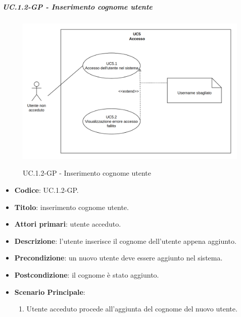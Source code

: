 			\subparagraph{UC\theuccount.1.2-GP - Inserimento cognome utente}
				\begin{figure}[H]
					\centering
					\includegraphics[width=\columnwidth]{img/UC5.png}\\
					\caption{UC\theuccount.1.2-GP - Inserimento cognome utente}
				\end{figure}
				\begin{itemize}
					\item \textbf{Codice}: UC\theuccount.1.2-GP.
					\item \textbf{Titolo}: inserimento cognome utente.
					\item \textbf{Attori primari}: utente acceduto.
					\item \textbf{Descrizione}: l'utente inserisce il cognome dell'utente appena aggiunto.
					\item \textbf{Precondizione}: un nuovo utente deve essere aggiunto nel sistema.
					\item \textbf{Postcondizione}: il cognome è stato aggiunto.
					\item \textbf{Scenario Principale}:
					\begin{enumerate}
						\item Utente acceduto procede all'aggiunta del cognome del nuovo utente.
					\end{enumerate}
				\end{itemize}

